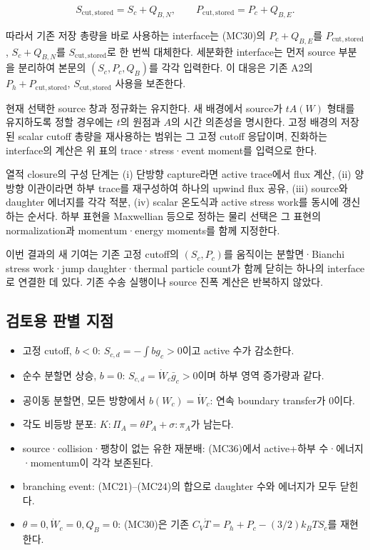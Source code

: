 \documentclass[11pt,a4paper]{article}
\providecommand{\tightlist}{\setlength{\itemsep}{2pt}\setlength{\parskip}{0pt}}
\begin{document}
\[
S_{\mathrm{cut,stored}}=S_c+Q_{B,N},\qquad
P_{\mathrm{cut,stored}}=P_c+Q_{B,E}.
\tag{MC37}
\]

따라서 기존 저장 총량을 바로 사용하는 interface는 (MC30)의 \(P_c+Q_{B,E}\)를 \(P_{\mathrm{cut,stored}}\), \(S_c+Q_{B,N}\)를 \(S_{\mathrm{cut,stored}}\)로 한 번씩 대체한다. 세분화한 interface는 먼저 source 부분을 분리하여 본문의 \((S_c,P_c,Q_B)\)를 각각 입력한다. 이 대응은 기존 A2의 \(P_h+P_{\mathrm{cut,stored}}\), \(S_{\mathrm{cut,stored}}\) 사용을 보존한다.

현재 선택한 source 창과 정규화는 유지한다. 새 배경에서 source가 \(tA(W)\) 형태를 유지하도록 정할 경우에는 \(t\)의 원점과 \(A\)의 시간 의존성을 명시한다. 고정 배경의 저장된 scalar cutoff 총량을 재사용하는 범위는 그 고정 cutoff 응답이며, 진화하는 interface의 계산은 위 표의 trace·stress·event moment를 입력으로 한다.

열적 closure의 구성 단계는 (i) 단방향 capture라면 active trace에서 flux 계산, (ii) 양방향 이관이라면 하부 trace를 재구성하여 하나의 upwind flux 공유, (iii) source와 daughter 에너지를 각각 적분, (iv) scalar 온도식과 active stress work를 동시에 갱신하는 순서다. 하부 표현을 Maxwellian 등으로 정하는 물리 선택은 그 표현의 normalization과 momentum·energy moments를 함께 지정한다.

이번 결과의 새 기여는 기존 고정 cutoff의 \((S_c,P_c)\)를 움직이는 분할면·Bianchi stress work·jump daughter·thermal particle count가 함께 닫히는 하나의 interface로 연결한 데 있다. 기존 수송 실행이나 source 진폭 계산은 반복하지 않았다.

\hypertarget{uxac80uxd1a0uxc6a9-uxd310uxbcc4-uxc9c0uxc810}{%
\subsection{검토용 판별 지점}\label{uxac80uxd1a0uxc6a9-uxd310uxbcc4-uxc9c0uxc810}}

\begin{itemize}
\tightlist
\item
  고정 cutoff, \(b<0\): \(S_{c,d}=-\int bg_c>0\)이고 active 수가 감소한다.
\item
  순수 분할면 상승, \(b=0\): \(S_{c,d}=\dot W_c\bar g_c>0\)이며 하부 영역 증가량과 같다.
\item
  공이동 분할면, 모든 방향에서 \(b(W_c)=\dot W_c\): 연속 boundary transfer가 0이다.
\item
  각도 비등방 분포: \(K:\Pi_A=\theta P_A+\sigma:\pi_A\)가 남는다.
\item
  source·collision·팽창이 없는 유한 재분배: (MC36)에서 active+하부 수·에너지·momentum이 각각 보존된다.
\item
  branching event: (MC21)--(MC24)의 합으로 daughter 수와 에너지가 모두 닫힌다.
\item
  \(\theta=0,\dot W_c=0,Q_B=0\): (MC30)은 기존 \(C_V\dot T=P_h+P_c-(3/2)k_BT S_c\)를 재현한다.
\end{itemize}
\end{document}
